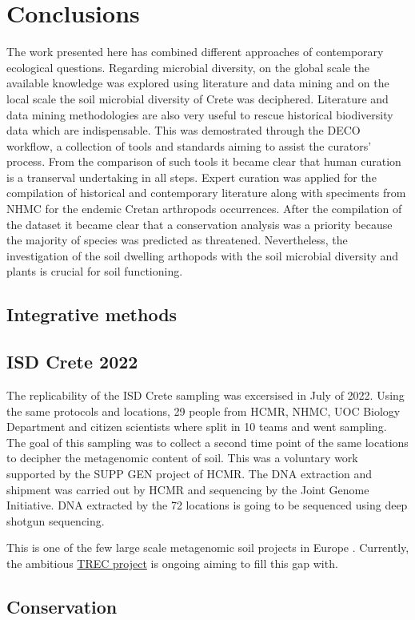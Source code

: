 % 
% 


\chapter{Conclusions}
\label{cha:conclusions}

The work presented here has combined different approaches of contemporary 
ecological questions. Regarding microbial diversity, on the global scale the available 
knowledge was explored using literature and data mining and on the local scale
the soil microbial diversity of Crete was deciphered. Literature and data mining 
methodologies are also very useful to rescue historical biodiversity data which are
indispensable. This was demostrated through the DECO workflow, a collection
of tools and standards aiming to assist the curators' process. From the comparison
of such tools it became clear that human curation is a transerval undertaking in all steps.
Expert curation was applied for the compilation of historical and contemporary
literature along with speciments from NHMC for the endemic Cretan arthropods occurrences.
After the compilation of the dataset it became clear that a conservation analysis
was a priority because the majority of species was predicted as threatened.
Nevertheless, the investigation of the soil dwelling arthopods with the soil microbial diversity
and plants is crucial for soil functioning. 


\section{Integrative methods}
\label{sec:integration}

\section{ISD Crete 2022}
\label{sec:isd-crete-2022}

The replicability of the ISD Crete sampling was excersised in July of 2022.
Using the same protocols and locations, 29 people from HCMR, NHMC, UOC Biology
Department and citizen scientists where split in 10 teams and went sampling. 
The goal of this sampling was to collect a second time point of the same locations
to decipher the metagenomic content of soil. This was a voluntary work supported 
by the SUPP GEN project of HCMR. The DNA extraction and shipment was carried out 
by HCMR and sequencing by the Joint Genome Initiative. DNA extracted by the 72 locations 
is going to be sequenced using deep shotgun sequencing.

This is one of the few large scale metagenomic soil projects in
Europe \parencite{nayfach2021a-genomic, ma2023a-genomic}. Currently, 
the ambitious \href{https://www.embl.org/about/info/trec/}{TREC project} is
ongoing aiming to fill this gap with.

\section{Conservation}
\label{sec:conservation}

% 
